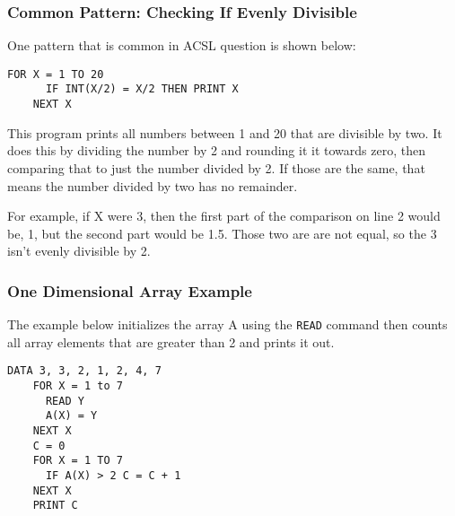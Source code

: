 \documentclass[handout,fleqn, t]{beamer}
\begin{document}
\begin{frame}[fragile]
  \frametitle{Common Pattern: Checking If Evenly Divisible}

  One pattern that is common in ACSL question is shown below:

  \begin{lstlisting}[gobble=4]
    FOR X = 1 TO 20
      IF INT(X/2) = X/2 THEN PRINT X
    NEXT X
  \end{lstlisting}

  This program prints all numbers between 1 and 20 that are divisible by two.
  It does this by dividing the number by 2 and rounding it it towards zero,
  then comparing that to just the number divided by 2.  If those are the same,
  that means the number divided by two has no remainder.

  For example, if X were 3, then the first part of the comparison on line 2
  would be, 1, but the second part would be 1.5.  Those two are are not equal,
  so the 3 isn't evenly divisible by 2.
\end{frame}


\begin{frame}[fragile]
  \frametitle{One Dimensional Array Example}

  The example below initializes the array A using the \lstinline{READ} command
  then counts all array elements that are greater than 2 and prints it out.

  \begin{lstlisting}[gobble=4]
    DATA 3, 3, 2, 1, 2, 4, 7
    FOR X = 1 to 7
      READ Y
      A(X) = Y
    NEXT X
    C = 0
    FOR X = 1 TO 7
      IF A(X) > 2 C = C + 1
    NEXT X
    PRINT C
  \end{lstlisting}
\end{frame}
\end{document}
